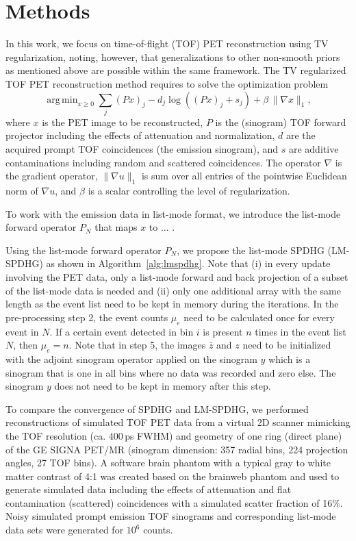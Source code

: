 \documentclass{IEEEtran}
\DeclareMathOperator*{\argmin}{arg\,min}
\begin{document}
\section{Methods}

In this work, we focus on time-of-flight (TOF) PET reconstruction using TV regularization, 
noting, however, that generalizations to other non-smooth priors as mentioned above are possible 
within the same framework. 
The TV regularized TOF PET reconstruction method requires to solve the optimization problem
%
\begin{equation}
\argmin _{x\geq 0} \sum_j (Px)_j -  d_j \log \left( (Px)_ j + s_j \right) + \beta \, \|\nabla x\|_{1},
\end{equation}
%
where $x$ is the PET image to be reconstructed, $P$ is the (sinogram) TOF forward projector including 
the effects of attenuation and normalization, $d$ are the acquired prompt TOF coincidences 
(the emission sinogram), and $s$ are additive contaminations including random and scattered coincidences.
The operator $\nabla$ is the gradient operator, $\|\nabla u \|_1$ is sum over all entries of the 
pointwise Euclidean norm of $\nabla u$, and $\beta$ is a scalar controlling the level of regularization.

To work with the emission data in list-mode format, we introduce the list-mode forward operator $P_N$
that maps $x$ to ... 
. 

Using the list-mode forward operator $P_N$, we propose the list-mode SPDHG (LM-SPDHG) as shown
in Algorithm~\ref{alg:lmspdhg}.
Note that (i) in every update involving the PET data, only a list-mode forward and back projection of
a subset of the list-mode data is needed and (ii) only one additional array with the same length
as the event list need to be kept in memory during the iterations.
In the pre-processing step 2, the event counts $\mu_e$ need to be calculated once for every event in $N$.
If a certain event detected in bin $i$ is present $n$ times in the event list $N$, then $\mu_e = n$.
Note that in step 5, the images $\bar{z}$ and $z$ need to be initialized with the adjoint sinogram
operator applied on the sinogram $y$ which is a sinogram that is one in all bins where no data was
recorded and zero else. The sinogram $y$ does not need to be kept in memory after this step.

To compare the convergence of SPDHG and LM-SPDHG, we performed reconstructions of simulated
TOF PET data from a virtual 2D scanner mimicking the TOF resolution (ca. 400\,ps FWHM) and 
geometry of one ring (direct plane) of the GE SIGNA PET/MR (sinogram dimension: 
357 radial bins, 224 projection angles, 27 TOF bins).
A software brain phantom with a typical gray to white matter contrast of 4:1 was created
based on the brainweb phantom and used to generate simulated data including the effects
of attenuation and flat contamination (scattered) coincidences
with a simulated scatter fraction of 16\%.
Noisy simulated prompt emission TOF sinograms and corresponding list-mode data sets 
were generated for $10^6$ counts.
\end{document}
